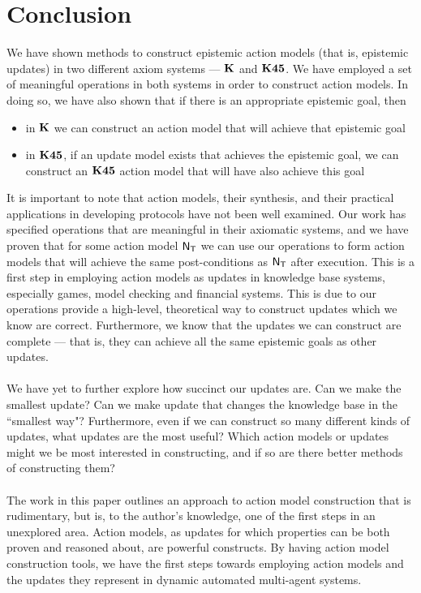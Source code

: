 \chapter{Conclusion}

We have shown methods to construct epistemic action models (that is, epistemic updates) in two different axiom systems --- $\bf K$
and $\bf K45$.
We have employed a set of meaningful operations in both systems in order to construct action models.
In doing so, we have also shown that if there is an appropriate epistemic goal, then
\begin{itemize}
	\item in $\bf K$ we can construct an action model that will achieve that epistemic goal
	\item in $\bf K45$, if an update model exists that achieves the epistemic goal, we can construct an
$\bf K45$ action model that will have also achieve this goal
\end{itemize}

It is important to note that action models, their synthesis, and their practical applications in
developing protocols have not been well examined.
Our work has specified operations that are meaningful in their axiomatic systems, and we have proven
that for some action model $\mathrm{\mathsf{N}}_\mathrm{\mathsf{T}}$ we can use our operations to form action models that will
achieve the same post-conditions as $\mathrm{\mathsf{N}}_\mathrm{\mathsf{T}}$ after execution.
This is a first step in employing action models as updates in knowledge base systems, especially
games, model checking and financial systems.
This is due to our operations provide a high-level, theoretical way to construct updates which we know are correct.
Furthermore, we know that the updates we can construct are complete --- that is, they can achieve
all the same epistemic goals as other updates.\\
\\
We have yet to further explore how succinct our updates are.
Can we make the smallest update?
Can we make update that changes the knowledge base in the ``smallest way"?
Furthermore, even if we can construct so many different kinds of updates, what updates are the most
useful?
Which action models or updates might we be most interested in constructing, and if so are there
better methods of constructing them?\\
\\
The work in this paper outlines an approach to action model construction that is rudimentary, but is,
to the author's knowledge, one of the first steps in an unexplored area.
Action models, as updates for which properties can be both proven and reasoned about, are powerful
constructs.
By having action model construction tools, we have the first steps towards employing action models and
the updates they represent in dynamic automated multi-agent systems.

